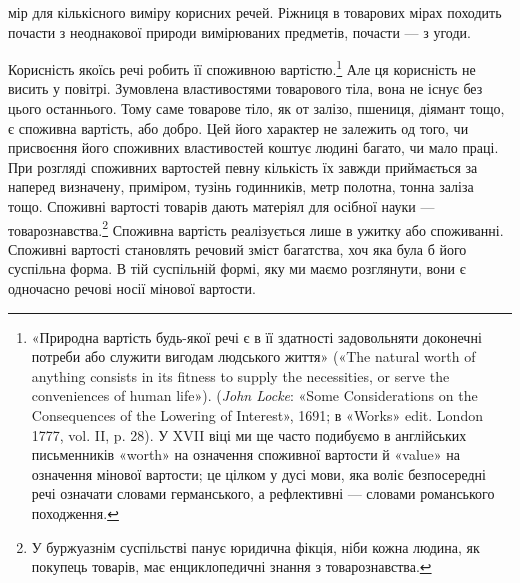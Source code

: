 \parcont{}  %
мір для кількісного виміру корисних речей. Ріжниця в товарових
мірах походить почасти з неоднакової природи вимірюваних
предметів, почасти — з угоди.

Корисність якоїсь речі робить її споживною вартістю.\footnote{
«Природна вартість будь-якої речі є в її здатності задовольняти
доконечні потреби або служити вигодам людського життя» («The natural
worth of anything consists in its fitness to supply the necessities, or serve
the conveniences of human life»). (\emph{John Locke}: «Some Considerations
on the Consequences of the Lowering of Interest», 1691; в «Works» edit.
London 1777, vol. II, p. 28). У XVII віці ми ще часто подибуємо в англійських
письменників «worth» на означення споживної вартости й
«value» на означення мінової вартости; це цілком у дусі мови, яка воліє
безпосередні речі означати словами германського, а рефлективні — словами
романського походження.
} Але ця корисність не висить у повітрі. Зумовлена властивостями товарового
тіла, вона не існує без цього останнього. Тому саме товарове
тіло, як от залізо, пшениця, діямант тощо, є споживна
вартість, або добро. Цей його характер не залежить од того, чи
присвоєння його споживних властивостей коштує людині багато,
чи мало праці. При розгляді споживних вартостей певну кількість
їх завжди приймається за наперед визначену, приміром,
тузінь годинників, метр полотна, тонна заліза тощо. Споживні
вартості товарів дають матеріял для осібної науки — товарознавства.\footnote{
У буржуазнім суспільстві панує юридична фікція, ніби кожна людина,
як покупець товарів, має енциклопедичні знання з товарознавства.
} Споживна вартість реалізується лише в ужитку або споживанні.
Споживні вартості становлять речовий зміст багатства, хоч
яка була б його суспільна форма. В тій суспільній формі, яку ми
маємо розглянути, вони є одночасно речові носії мінової вартости.

